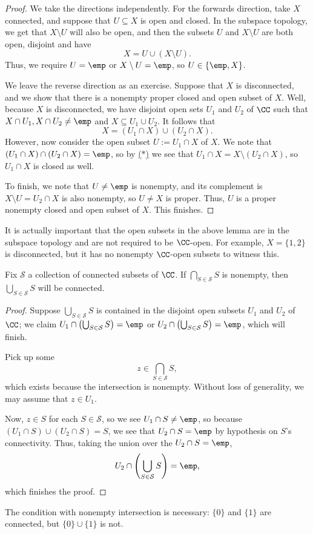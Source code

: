 \begin{proof}
	We take the directions independently. For the forwards direction, take $X$ connected, and suppose that $U\subseteq X$ is open and closed. In the subspace topology, we get that $X\setminus U$ will also be open, and then the subsets $U$ and $X\setminus U$ are both open, disjoint and have
	\[X=U\cup(X\setminus U).\]
	Thus, we require $U=\emp$ or $X\setminus U=\emp$, so $U\in\{\emp,X\}$.

	We leave the reverse direction as an exercise. Suppose that $X$ is disconnected, and we show that there is a nonempty proper closed and open subset of $X$. Well, because $X$ is disconnected, we have disjoint open sets $U_1$ and $U_2$ of $\CC$ such that $X\cap U_1,X\cap U_2\ne\emp$ and $X\subseteq U_1\cup U_2$. It follows that
	\[X=(U_1\cap X)\cup(U_2\cap X).\tag{$*$}\label{eq:xdisconnect}\]
	However, now consider the open subset $U:=U_1\cap X$ of $X$. We note that $(U_1\cap X)\cap(U_2\cap X)=\emp$, so by \hyperref[eq:xdisconnect]{($*$)} we see that $U_1\cap X=X\setminus(U_2\cap X)$, so $U_1\cap X$ is closed as well.

	To finish, we note that $U\ne\emp$ is nonempty, and its complement is $X\setminus U=U_2\cap X$ is also nonempty, so $U\ne X$ is proper. Thus, $U$ is a proper nonempty closed and open subset of $X$. This finishes.
\end{proof}
\begin{remark}[Nir]
	It is actually important that the open subsets in the above lemma are in the subspace topology and are not required to be $\CC$-open. For example, $X=\{1,2\}$ is disconnected, but it has no nonempty $\CC$-open subsets to witness this.
\end{remark}
\begin{lemma} \label{lem:unionconnected}
	Fix $\mathcal S$ a collection of connected subsets of $\CC$. If $\bigcap_{S\in\mathcal S}S$ is nonempty, then $\bigcup_{S\in\mathcal S}S$ will be connected.
\end{lemma}
\begin{proof}
	Suppose $\bigcup_{S\in\mathcal S}S$ is contained in the disjoint open subsets $U_1$ and $U_2$ of $\CC$; we claim $U_1\cap\left(\bigcup_{S\in\mathcal S}S\right)=\emp$ or $U_2\cap\left(\bigcup_{S\in\mathcal S}S\right)=\emp$, which will finish.
	
	Pick up some
	\[z\in\bigcap_{S\in\mathcal S}S,\]
	which exists because the intersection is nonempty. Without loss of generality, we may assume that $z\in U_1$.

	Now, $z\in S$ for each $S\in\mathcal S$, so we see $U_1\cap S\ne\emp$, so because $(U_1\cap S)\cup(U_2\cap S)=S$, we see that $U_2\cap S=\emp$ by hypothesis on $S$'s connectivity. Thus, taking the union over the $U_2\cap S=\emp$,
	\[U_2\cap\left(\bigcup_{S\in\mathcal S}S\right)=\emp,\]
	which finishes the proof.
\end{proof}
\begin{remark}
	The condition with nonempty intersection is necessary: $\{0\}$ and $\{1\}$ are connected, but $\{0\}\cup\{1\}$ is not.
\end{remark}